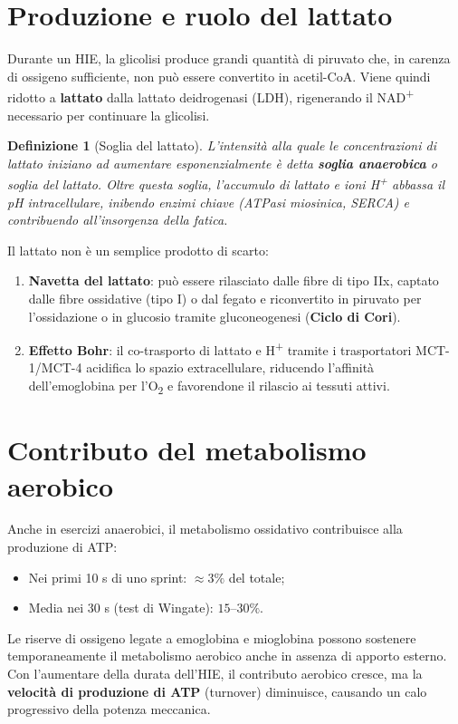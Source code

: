 \documentclass[12pt,a4paper]{report}
\newtheorem{definizione}{Definizione}[section]
\begin{document}
\section{Produzione e ruolo del lattato}
Durante un HIE, la glicolisi produce grandi quantità di piruvato che, in carenza di ossigeno sufficiente, non può essere convertito in acetil-CoA. Viene quindi ridotto a \textbf{lattato} dalla lattato deidrogenasi (LDH), rigenerando il NAD\textsuperscript{+} necessario per continuare la glicolisi.
\begin{definizione}[Soglia del lattato]
L'intensità alla quale le concentrazioni di lattato iniziano ad aumentare esponenzialmente è detta \textbf{soglia anaerobica} o soglia del lattato. Oltre questa soglia, l'accumulo di lattato e ioni H\textsuperscript{+} abbassa il pH intracellulare, inibendo enzimi chiave (ATPasi miosinica, SERCA) e contribuendo all'insorgenza della fatica.
\end{definizione}
Il lattato non è un semplice prodotto di scarto:
\begin{enumerate}
\item \textbf{Navetta del lattato}: può essere rilasciato dalle fibre di tipo IIx, captato dalle fibre ossidative (tipo I) o dal fegato e riconvertito in piruvato per l'ossidazione o in glucosio tramite gluconeogenesi (\textbf{Ciclo di Cori}).
\item \textbf{Effetto Bohr}: il co-trasporto di lattato e H\textsuperscript{+} tramite i trasportatori MCT-1/MCT-4 acidifica lo spazio extracellulare, riducendo l'affinità dell'emoglobina per l'O\textsubscript{2} e favorendone il rilascio ai tessuti attivi.
\end{enumerate}

\section{Contributo del metabolismo aerobico}
Anche in esercizi anaerobici, il metabolismo ossidativo contribuisce alla produzione di ATP:
\begin{itemize}
\item Nei primi 10 s di uno sprint: $\approx 3\%$ del totale;
\item Media nei 30 s (test di Wingate): $15\text{--}30\%$.
\end{itemize}
Le riserve di ossigeno legate a emoglobina e mioglobina possono sostenere temporaneamente il metabolismo aerobico anche in assenza di apporto esterno. Con l'aumentare della durata dell'HIE, il contributo aerobico cresce, ma la \textbf{velocità di produzione di ATP} (turnover) diminuisce, causando un calo progressivo della potenza meccanica.
\end{document}

